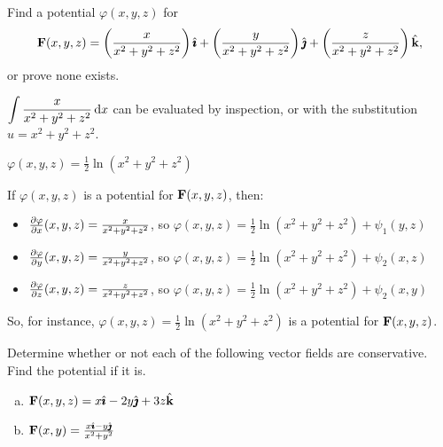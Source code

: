 \begin{question}
Find a potential $\varphi(x,y,z)$ for \[\mathbf{F}(x,y,z)=\left( \frac{x}{x^2+y^2+z^2}\right)\hat{\pmb{\imath}}+\left( \frac{y}{x^2+y^2+z^2}\right)\hat{\pmb{\jmath}}+\left( \frac{z}{x^2+y^2+z^2}\right)\hat{\mathbf{k}},\] or prove none exists. 
\end{question}
\begin{hint}
$\displaystyle\int\frac{x}{x^2+y^2+z^2}\,\mathrm{d}x$ can be evaluated by inspection, or with the substitution \\$u=x^2+y^2+z^2$.
\end{hint}
\begin{answer}
$\varphi(x,y,z) = \frac12\ln(x^2+y^2+z^2)$
\end{answer}
\begin{solution}
If $\varphi(x,y,z)$ is a potential for $\mathbf{F}(x,y,z)$, then:
\begin{itemize}
\item $\pdiff{\varphi}{x}(x,y,z)=\frac{x}{x^2+y^2+z^2}$, so $\varphi(x,y,z) = \frac12\ln(x^2+y^2+z^2)+\psi_1(y,z)$
\item $\pdiff{\varphi}{y}(x,y,z)=\frac{y}{x^2+y^2+z^2}$, so $\varphi(x,y,z) = \frac12\ln(x^2+y^2+z^2)+\psi_2(x,z)$
\item $\pdiff{\varphi}{z}(x,y,z)=\frac{z}{x^2+y^2+z^2}$, so $\varphi(x,y,z) = \frac12\ln(x^2+y^2+z^2)+\psi_2(x,y)$
\end{itemize}
So, for instance, $\varphi(x,y,z)= \frac{1}{2}\ln(x^2+y^2+z^2)$ is a potential for $\mathbf{F}(x,y,z)$.

\end{solution}

\begin{question}
Determine whether or not each of the following vector
fields are conservative. Find the potential if it is.
\begin{enumerate}[(a)]
\item
   $\mathbf{F}(x,y,z)=x\hat{\pmb{\imath}}-2y\hat{\pmb{\jmath}}+3z\hat{\mathbf{k}}$
\item
   $\mathbf{F}(x,y)=\frac{x\hat{\pmb{\imath}}-y\hat{\pmb{\jmath}}}{x^2+y^2}$
\end{enumerate}
\end{question}


